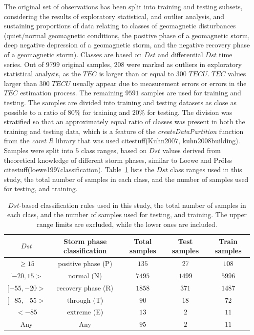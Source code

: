 \let\LaTeXcline\cline\documentclass[sn-mathphys-num]{sn-jnl}\let\cline\LaTeXcline
\begin{document}
The original set of observations has been split into training and testing subsets, considering the results of exploratory statistical, and outlier analysis, and sustaining proportions of data relating to classes of geomagnetic disturbances (quiet/normal geomagnetic conditions, the positive phase of a geomagnetic storm, deep negative depression of a geomagnetic storm, and the negative recovery phase of a geomagnetic storm). Classes are based on $Dst$ and differential $Dst$ time series. Out of $9799$ original samples, $208$ were marked as outliers in exploratory statistical analysis, as the $TEC$ is larger than or equal to $300$ $TECU$. $TEC$ values larger than $300$ $TECU$ usually appear due to measurement errors or errors in the $TEC$ estimation process. The remaining $9591$ samples are used for training and testing. The samples are divided into training and testing datasets as close as possible to a ratio of $80\%$ for training and $20\%$ for testing. The division was stratified so that an approximately equal ratio of classes was present in both the training and testing data, which is a feature of the \textit{createDataPartition} function from the \textit{caret} \textit{R} library that was used citestuff(Kuhn2007, kuhn2008building). Samples were split into $5$ class ranges, based on $Dst$ values derived from theoretical knowledge of different storm phases, similar to Loewe and Prölss citestuff(loewe1997classification). Table~\ref{tab:Dstranges} lists the $Dst$ class ranges used in this study, the total number of samples in each class, and the number of samples used for testing, and training.

\begin{table}[!ht]
    \centering
    \caption{$Dst$-based classification rules used in this study, the total number of samples in each class, and the number of samples used for testing, and training. The upper range limits are excluded, while the lower ones are included.}
    \label{tab:Dstranges}
    \begin{tabular}{|c|c|c|c|c|}
        \hline
        $Dst$ & Storm phase classification & Total samples & Test samples & Train samples \\ \hline
        $ \geq 15 $ & positive phase (P) & $135$ & $27$ & $108$ \\ \hline
        $[-20, 15>$ & normal (N) & $7495$ & $1499$ & $5996$ \\ \hline
        $[-55, -20>$ & recovery phase (R) & $1858$ & $371$ & $1487$ \\ \hline
        $[-85, -55>$ & through (T) & $90$ & $18$ & $72$ \\ \hline
        $ < -85$ & extreme (E) & $13$ & $2$ & $11$ \\ \hline
        Any & Any & $95$ & $2$ & $11$ \\ \hline
    \end{tabular}
\end{table}
\end{document}
